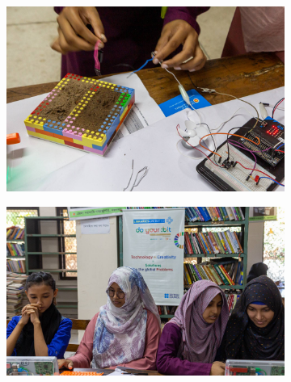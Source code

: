 \documentclass[12pt]{report} %
\begin{document}
\begin{figure}[t!]
   
        \begin{subfigure}[]{0.46\textwidth}
        \centering
        \includegraphics[width=1.0\textwidth]{dyb_coxsbazar_s_28}
    \end{subfigure}
    \begin{subfigure}[]{0.46\textwidth}
        \centering
        \includegraphics[width=1.0\textwidth]{dyb_coxsbazar_s_32}
    \end{subfigure}
    

\end{figure}
\end{document}

